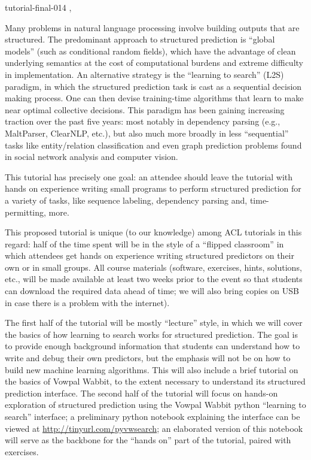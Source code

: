 \begin{tutorial}{tutorial-final-014}
  {\daydateyear, \tutorialmorningtime}
  {\TutLocA}

Many problems in natural language processing involve building outputs that are structured. The predominant approach to structured prediction is ``global models'' (such as conditional random fields), which have the advantage of clean underlying semantics at the cost of computational burdens and extreme difficulty in implementation. An alternative strategy is the ``learning to search'' (L2S) paradigm, in which the structured prediction task is cast as a sequential decision making process. One can then devise training-time algorithms that learn to make near optimal collective decisions. This paradigm has been gaining increasing traction over the past five years: most notably in dependency parsing (e.g., MaltParser, ClearNLP, etc.), but also much more broadly in less ``sequential'' tasks like entity/relation classification and even graph prediction problems found in social network analysis and computer vision.

This tutorial has precisely one goal: an attendee should leave the tutorial with hands on experience writing small programs to perform structured prediction for a variety of tasks, like sequence labeling, dependency parsing and, time-permitting, more.

This proposed tutorial is unique (to our knowledge) among ACL tutorials in this regard: half of the time spent will be in the style of a ``flipped classroom'' in which attendees get hands on experience writing structured predictors on their own or in small groups. All course materials (software, exercises, hints, solutions, etc., will be made available at least two weeks prior to the event so that students can download the required data ahead of time; we will also bring copies on USB in case there is a problem with the internet).

The first half of the tutorial will be mostly ``lecture'' style, in which we will cover the basics of how learning to search works for structured prediction. The goal is to provide enough background information that students can understand how to write and debug their own predictors, but the emphasis will not be on how to build new machine learning algorithms. This will also include a brief tutorial on the basics of Vowpal Wabbit, to the extent necessary to understand its structured prediction interface. The second half of the tutorial will focus on hands-on exploration of structured prediction using the Vowpal Wabbit python ``learning to search'' interface; a preliminary python notebook explaining the interface can be viewed at \url{http://tinyurl.com/pyvwsearch}; an elaborated version of this notebook will serve as the backbone for the ``hands on'' part of the tutorial, paired with exercises.

\end{tutorial}
